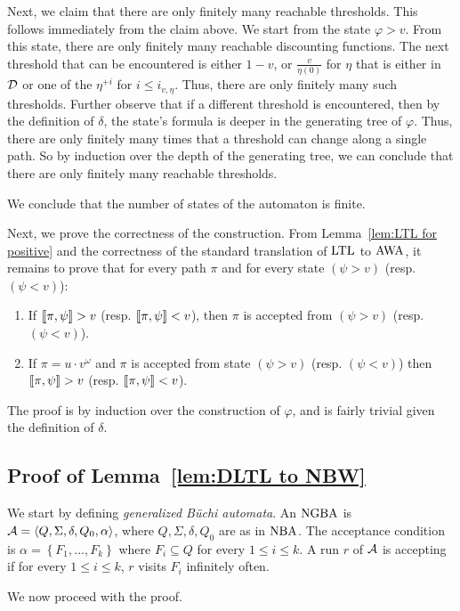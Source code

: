 \documentclass{llncs}
\newcommand{\set}[1]{{\left\{#1\right\}}}
\newcommand{\zug}[1]{\langle #1  \rangle}
\newcommand{\LTL}{{\ensuremath{\rm LTL}}\xspace}
\newcommand{\NGBW}{\mbox{\rm NGBA}\xspace}
\newcommand{\NBW}{\mbox{\rm NBA}\xspace}
\newcommand{\AWW}{\mbox{\rm AWA}\xspace}
\newcommand{\D}{{\cal D}}
\newcommand{\A}{{\cal A}}
\renewcommand{\phi}{\varphi}
\newcommand{\df}{\eta}
\begin{document}
Next, we claim that there are only finitely many reachable thresholds. This follows immediately from the claim above. We start from the state $\phi>v$. From this state, there are only finitely many reachable discounting functions. The next threshold that can be encountered is either $1-v$, or $\frac{v}{\df(0)}$ for $\df$ that is either in $\D$ or one of the $\df^{+i}$ for $i\le i_{v,\df}$. Thus, there are only finitely many such thresholds. Further observe that if a different threshold is encountered, then by the definition of $\delta$, the state's formula is deeper in the generating tree of $\phi$. Thus, there are only finitely many times that a threshold can change along a single path. So by induction over the depth of the generating tree, we can conclude that there are only finitely many reachable thresholds.

We conclude that the number of states of the automaton is finite.

Next, we prove the correctness of the construction. From Lemma~\ref{lem:LTL for positive} and the correctness of the standard translation of $\LTL$ to $\AWW$, it remains to prove that for every path $\pi$ and for every state $(\psi > v)$ (resp. $(\psi < v)$):
\begin{enumerate}
\item If $[\![\pi,\psi]\!]>v$ (resp. $[\![\pi,\psi]\!]<v$), then $\pi$ is accepted from $(\psi > v)$ (resp. $(\psi < v)$).
\item If $\pi=u\cdot v^\omega$ and $\pi$ is accepted from state $(\psi > v)$ (resp. $(\psi < v)$) then $[\![\pi,\psi]\!]>v$ (resp. $[\![\pi,\psi]\!]<v$).
\end{enumerate} 

The proof is by induction over the construction of $\phi$, and is fairly trivial given the definition of $\delta$.




\subsection{Proof of Lemma~\ref{lem:DLTL to NBW}}
We start by defining {\em generalized B\"uchi automata}. An $\NGBW$ is $\A=\zug{Q,\Sigma,\delta,Q_0,\alpha}$, where $Q,\Sigma,\delta,Q_0$ are as in $\NBW$. The acceptance condition is $\alpha=\set{F_1,...,F_k}$ where $F_i\subseteq Q$ for every $1\le i\le k$. A run $r$ of $\A$ is accepting if for every $1\le i\le k$, $r$ visits $F_i$ infinitely often.

We now proceed with the proof.
\end{document}
